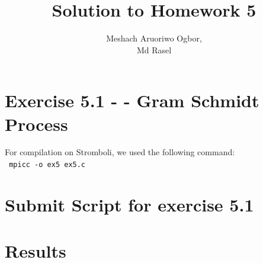 \documentclass[11pt]{article}
\begin{document}
\title{Solution to Homework 5}

\author{
   Meshach Aruoriwo Ogbor,\\
   Md Rasel}

\maketitle

\section{Exercise 5.1 - - Gram Schmidt Process}

For compilation on Stromboli, we used the following command: \\
\verb+ mpicc -o ex5 ex5.c+
\newpage

\section{Submit Script for exercise 5.1}

\section{Results}

\end{document}

